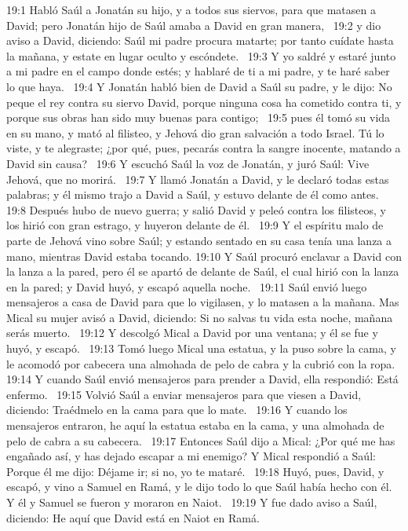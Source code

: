 19:1 Habló Saúl a Jonatán su hijo, y a todos sus siervos, para que matasen a David; pero Jonatán hijo de Saúl amaba a David en gran manera,  
19:2 y dio aviso a David, diciendo: Saúl mi padre procura matarte; por tanto cuídate hasta la mañana, y estate en lugar oculto y escóndete.  
19:3 Y yo saldré y estaré junto a mi padre en el campo donde estés; y hablaré de ti a mi padre, y te haré saber lo que haya.  
19:4 Y Jonatán habló bien de David a Saúl su padre, y le dijo: No peque el rey contra su siervo David, porque ninguna cosa ha cometido contra ti, y porque sus obras han sido muy buenas para contigo;  
19:5 pues él tomó su vida en su mano, y mató al filisteo, y Jehová dio gran salvación a todo Israel. Tú lo viste, y te alegraste; ¿por qué, pues, pecarás contra la sangre inocente, matando a David sin causa?  
19:6 Y escuchó Saúl la voz de Jonatán, y juró Saúl: Vive Jehová, que no morirá.  
19:7 Y llamó Jonatán a David, y le declaró todas estas palabras; y él mismo trajo a David a Saúl, y estuvo delante de él como antes.  
19:8 Después hubo de nuevo guerra; y salió David y peleó contra los filisteos, y los hirió con gran estrago, y huyeron delante de él.  
19:9 Y el espíritu malo de parte de Jehová vino sobre Saúl; y estando sentado en su casa tenía una lanza a mano, mientras David estaba tocando. 
19:10 Y Saúl procuró enclavar a David con la lanza a la pared, pero él se apartó de delante de Saúl, el cual hirió con la lanza en la pared; y David huyó, y escapó aquella noche.  
19:11 Saúl envió luego mensajeros a casa de David para que lo vigilasen, y lo matasen a la mañana. Mas Mical su mujer avisó a David, diciendo: Si no salvas tu vida esta noche, mañana serás muerto.  
19:12 Y descolgó Mical a David por una ventana; y él se fue y huyó, y escapó.  
19:13 Tomó luego Mical una estatua, y la puso sobre la cama, y le acomodó por cabecera una almohada de pelo de cabra y la cubrió con la ropa.  
19:14 Y cuando Saúl envió mensajeros para prender a David, ella respondió: Está enfermo.  
19:15 Volvió Saúl a enviar mensajeros para que viesen a David, diciendo: Traédmelo en la cama para que lo mate.  
19:16 Y cuando los mensajeros entraron, he aquí la estatua estaba en la cama, y una almohada de pelo de cabra a su cabecera.  
19:17 Entonces Saúl dijo a Mical: ¿Por qué me has engañado así, y has dejado escapar a mi enemigo? Y Mical respondió a Saúl: Porque él me dijo: Déjame ir; si no, yo te mataré.  
19:18 Huyó, pues, David, y escapó, y vino a Samuel en Ramá, y le dijo todo lo que Saúl había hecho con él. Y él y Samuel se fueron y moraron en Naiot.  
19:19 Y fue dado aviso a Saúl, diciendo: He aquí que David está en Naiot en Ramá.  
